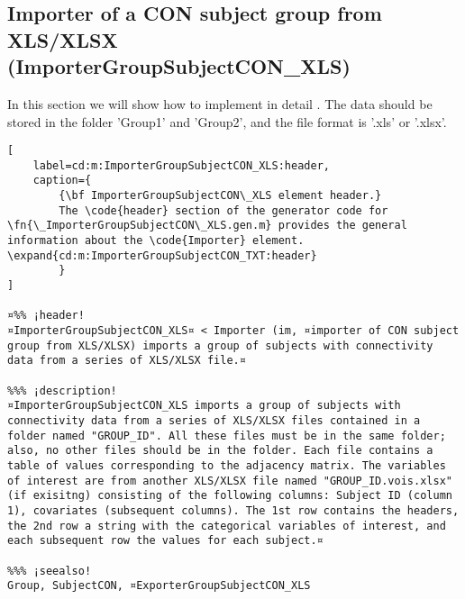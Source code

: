 \documentclass{tufte-handout}
\begin{document}
\subsection{Importer of a CON subject group from XLS/XLSX (ImporterGroupSubjectCON\_XLS)}

In this section we will show how to implement in detail . The data should be stored in the folder 'Group1' and 'Group2', and the file format is '.xls' or '.xlsx'.

\begin{lstlisting}[
	label=cd:m:ImporterGroupSubjectCON_XLS:header,
	caption={
		{\bf ImporterGroupSubjectCON\_XLS element header.}
		The \code{header} section of the generator code for \fn{\_ImporterGroupSubjectCON\_XLS.gen.m} provides the general information about the \code{Importer} element. \expand{cd:m:ImporterGroupSubjectCON_TXT:header}
		}
]

¤%% ¡header!
¤ImporterGroupSubjectCON_XLS¤ < Importer (im, ¤importer of CON subject group from XLS/XLSX) imports a group of subjects with connectivity data from a series of XLS/XLSX file.¤

%%% ¡description!
¤ImporterGroupSubjectCON_XLS imports a group of subjects with connectivity data from a series of XLS/XLSX files contained in a folder named "GROUP_ID". All these files must be in the same folder; also, no other files should be in the folder. Each file contains a table of values corresponding to the adjacency matrix. The variables of interest are from another XLS/XLSX file named "GROUP_ID.vois.xlsx" (if exisitng) consisting of the following columns: Subject ID (column 1), covariates (subsequent columns). The 1st row contains the headers, the 2nd row a string with the categorical variables of interest, and each subsequent row the values for each subject.¤

%%% ¡seealso!
Group, SubjectCON, ¤ExporterGroupSubjectCON_XLS
\end{lstlisting}
\end{document}
